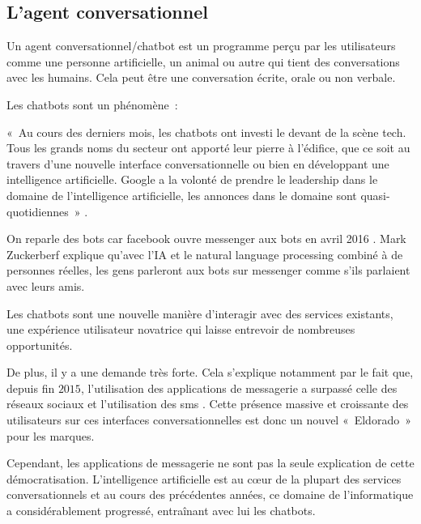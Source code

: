 \subsection{L'agent conversationnel}

Un agent conversationnel/chatbot est un programme perçu par les utilisateurs comme une personne artificielle, un animal ou autre qui tient des conversations avec les humains. Cela peut être  une conversation écrite, orale ou non verbale. \cite{ref4}
\vspace{1em}

	Les chatbots sont un phénomène : 
	\vspace{1em}
	
« Au cours des derniers mois, les chatbots ont investi le devant de la scène tech. Tous les grands noms du secteur ont apporté leur pierre à l’édifice, que ce soit au travers d’une nouvelle interface conversationnelle ou bien en développant une intelligence artificielle. Google a la volonté de prendre le leadership dans le domaine de l’intelligence artificielle, les annonces dans le domaine sont quasi-quotidiennes » \cite{ref5}.
\vspace{1em}

	On reparle des bots car facebook ouvre messenger aux bots en avril 2016 \cite{ref6}.
Mark Zuckerberf explique qu’avec l’IA et le natural language processing combiné à de personnes réelles, les gens parleront aux bots sur messenger comme s’ils parlaient avec leurs amis.
\vspace{1em}

	Les chatbots sont une nouvelle manière d’interagir avec des services existants, une expérience utilisateur novatrice qui laisse entrevoir de nombreuses opportunités.
	\vspace{1em}
	
	De plus, il y a une demande très forte. Cela s’explique notamment par le fait que, depuis fin $2015$, l’utilisation des applications de messagerie a surpassé celle des réseaux sociaux et l’utilisation des sms \cite{ref4}. Cette présence massive et croissante des utilisateurs sur ces interfaces conversationnelles est donc un nouvel « Eldorado » pour les marques. 
	\vspace{1em}
	
	Cependant, les applications de messagerie ne sont pas la seule explication de cette démocratisation. L’intelligence artificielle est au cœur de la plupart des services conversationnels et au cours des précédentes années, ce domaine de l’informatique a considérablement progressé, entraînant avec lui les chatbots.

